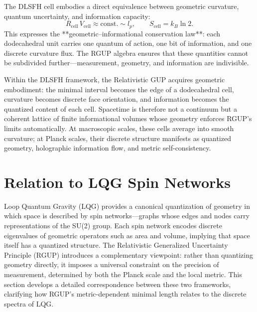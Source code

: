 \documentclass[11pt,oneside]{book}
\newenvironment{booknote}{
  \begin{tcolorbox}[
    colback=gray!3!white,
    colframe=gray!45!black,
    fonttitle=\bfseries,
    title=\textbf{Book Note},
  ]
}{\end{tcolorbox}}
\numberwithin{equation}{chapter}
\begin{document}
The DLSFH cell embodies a direct equivalence between geometric curvature, quantum uncertainty, and information capacity:
\begin{equation}
R_{\text{cell}}\,V_{\text{cell}} \approx \text{const.} \sim l_p,
\qquad
S_{\text{cell}} = k_B \ln 2.
\end{equation}
This expresses the **geometric–informational conservation law**:
each dodecahedral unit carries one quantum of action, one bit of information, and one discrete curvature flux.  
The RGUP algebra ensures that these quantities cannot be subdivided further—measurement, geometry, and information are indivisible. \vspace{0.8em}

\begin{booknote}
Within the DLSFH framework, the Relativistic GUP acquires geometric embodiment: the minimal interval becomes the edge of a dodecahedral cell, curvature becomes discrete face orientation, and information becomes the quantized content of each cell.  
Spacetime is therefore not a continuum but a coherent lattice of finite informational volumes whose geometry enforces RGUP’s limits automatically.  
At macroscopic scales, these cells average into smooth curvature; at Planck scales, their discrete structure manifests as quantized geometry, holographic information flow, and metric self-consistency.
\end{booknote}

\section{Relation to LQG Spin Networks}

Loop Quantum Gravity (LQG) provides a canonical quantization of geometry in which space is described by spin networks—graphs whose edges and nodes carry representations of the SU(2) group.  
Each spin network encodes discrete eigenvalues of geometric operators such as area and volume, implying that space itself has a quantized structure.  
The Relativistic Generalized Uncertainty Principle (RGUP) introduces a complementary viewpoint: rather than quantizing geometry directly, it imposes a universal constraint on the precision of measurement, determined by both the Planck scale and the local metric.  
This section develops a detailed correspondence between these two frameworks, clarifying how RGUP’s metric-dependent minimal length relates to the discrete spectra of LQG.
\end{document}
